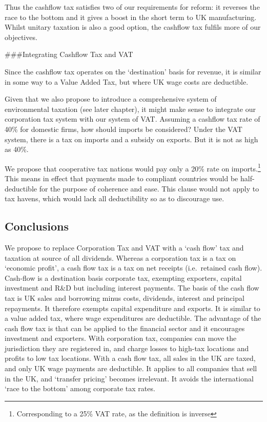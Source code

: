 \documentclass[]{tufte-handout}
\begin{document}
Thus the cashflow tax satisfies two of our requirements for reform: it
reverses the race to the bottom and it gives a boost in the short term
to UK manufacturing. Whilst unitary taxation is also a good option, the
cashflow tax fulfils more of our objectives.

\#\#\#Integrating Cashflow Tax and VAT

Since the cashflow tax operates on the `destination' basis for revenue,
it is similar in some way to a Value Added Tax, but where UK wage costs
are deductible.

Given that we also propose to introduce a comprehensive system of
environmental taxation (see later chapter), it might make sense to
integrate our corporation tax system with our system of VAT. Assuming a
cashflow tax rate of 40\% for domestic firms, how should imports be
considered? Under the VAT system, there is a tax on imports and a
subsidy on exports. But it is not as high as 40\%.

We propose that cooperative tax nations would pay only a 20\% rate on
imports.\footnote{Corresponding to a 25\% VAT rate, as the definition is
  inverse} This means in effect that payments made to compliant
countries would be half-deductible for the purpose of coherence and
ease. This clause would not apply to tax havens, which would lack all
deductibility so as to discourage use.

\hypertarget{conclusions-4}{%
\subsection{Conclusions}\label{conclusions-4}}

We propose to replace Corporation Tax and VAT with a `cash flow' tax and
taxation at source of all dividends. Whereas a corporation tax is a tax
on `economic profit', a cash flow tax is a tax on net receipts
(i.e.~retained cash flow). Cash-flow is a destination basis corporate
tax, exempting exporters, capital investment and R\&D but including
interest payments. The basis of the cash flow tax is UK sales and
borrowing minus costs, dividends, interest and principal repayments. It
therefore exempts capital expenditure and exports. It is similar to a
value added tax, where wage expenditures are deductible. The advantage
of the cash flow tax is that can be applied to the financial sector and
it encourages investment and exporters. With corporation tax, companies
can move the jurisdiction they are registered in, and charge losses to
high-tax locations and profits to low tax locations. With a cash flow
tax, all sales in the UK are taxed, and only UK wage payments are
deductible. It applies to all companies that sell in the UK, and
`transfer pricing' becomes irrelevant. It avoids the international `race
to the bottom' among corporate tax rates.
\end{document}
